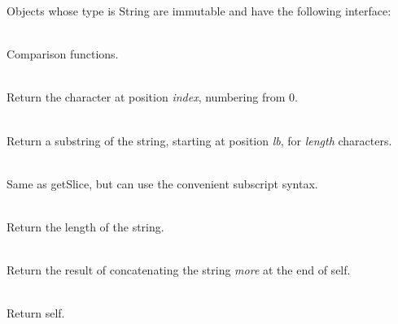 \noindent Objects whose type is String are immutable and have the following
interface:

\begin{desc}
  \item[\kw{function} \opd{$>$} \/\LB{}\tn{String}\/\RB{} \returns{} \/\LB{}\tn{Boolean}\/\RB{}]
  \item[\kw{function} \opd{$>=$} \/\LB{}\tn{String}\/\RB{} \returns{} \/\LB{}\tn{Boolean}\/\RB{}]
  \item[\kw{function} \opd{$<$} \/\LB{}\tn{String}\/\RB{} \returns{} \/\LB{}\tn{Boolean}\/\RB{}]
  \item[\kw{function} \opd{$<=$} \/\LB{}\tn{String}\/\RB{} \returns{} \/\LB{}\tn{Boolean}\/\RB{}]
  \item[\kw{function} \opd{$=$} \/\LB{}\tn{String}\/\RB{} \returns{} \/\LB{}\tn{Boolean}\/\RB{}]
  \item[\kw{function} \opd{$!=$} \/\LB{}\tn{String}\/\RB{} \returns{} \/\LB{}\tn{Boolean}\/\RB{}]~\\
    Comparison functions.
  \item[\kw{function} getElement\/\LB{}index \CO{} \tn{Integer}\/\RB{} \returns{} \/\LB{}\tn{Character}\/\RB{}]~\\
    Return the character at position {\it index}, numbering from 0.
  \item[\kw{function} getSlice\/\LB{}lb \CO{} \tn{Integer}, length \CO{} \tn{Integer}\/\RB{} \returns{} \/\LB{}\tn{String}\/\RB{}]~\\
    Return a substring of the string, starting at position {\it lb}, for
    {\it length} characters.
  \item[\kw{function} getElement\/\LB{}lb \CO{} \tn{Integer}, length \CO{} \tn{Integer}\/\RB{} \returns{} \/\LB{}\tn{String}\/\RB{}]~\\
    Same as getSlice, but can use the convenient subscript syntax.
  \item[\kw{function} length \returns{} \/\LB{}\tn{Integer}\/\RB{}]~\\
    Return the length of the string.
  \item[\kw{function} \opd{$|$$|$} \/\LB{}more \CO{} \tn{String}\/\RB{} \returns{} \/\LB{}\tn{String}\/\RB{}]~\\
    Return the result of concatenating the string {\it more} at the end of
    self. 
  \item[\kw{function} asString \returns{} \/\LB{}\tn{String}\/\RB{}]~\\
    Return self.
  \item[\kw{function} lowerbound \returns{} \/\LB{}\tn{Integer}\/\RB{}]~\\

\end{desc}
